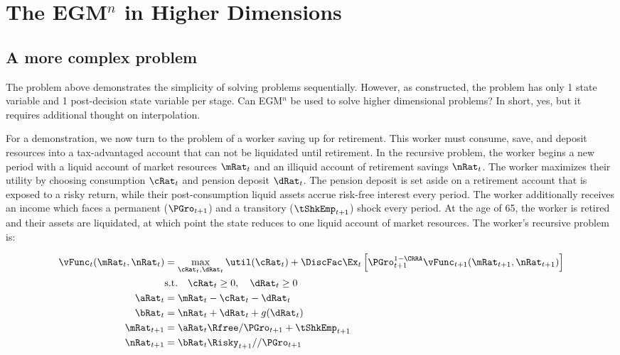 \documentclass[\econtexRoot/SequentialEGM]{subfiles}
\begin{document}
\hypertarget{higher-dimensions}{}
\par\section{The EGM$^n$ in Higher Dimensions}
\notinsubfile{\label{sec:higherdims}}

\subsection{A more complex problem}

The problem above demonstrates the simplicity of solving problems sequentially. However, as constructed, the problem has only 1 state variable and 1 post-decision state variable per stage. Can EGM$^n$ be used to solve higher dimensional problems? In short, yes, but it requires additional thought on interpolation.

For a demonstration, we now turn to the problem of a worker saving up for retirement. This worker must consume, save, and deposit resources into a tax-advantaged account that can not be liquidated until retirement. In the recursive problem, the worker begins a new period with a liquid account of market resources $\mRat_{t}$ and an illiquid account of retirement savings $\nRat_{t}$. The worker maximizes their utility by choosing consumption $\cRat_{t}$ and pension deposit $\dRat_{t}$. The pension deposit is set aside on a retirement account that is exposed to a risky return, while their post-consumption liquid assets accrue risk-free interest every period. The worker additionally receives an income which faces a permanent ($\PGro_{t+1}$) and a transitory ($\tShkEmp_{t+1}$) shock every period. At the age of 65, the worker is retired and their assets are liquidated, at which point the state reduces to one liquid account of market resources. The worker's recursive problem is:

\begin{equation}
    \begin{split}
        \vFunc_{t}(\mRat_{t}, \nRat_{t}) & = \max_{\cRat_{t}, \dRat_{t}} \util(\cRat_{t}) + \DiscFac \Ex_{t} \left[ \PGro_{t+1}^{1-\CRRA} \vFunc_{t+1}(\mRat_{t+1}, \nRat_{t+1}) \right] \\
        & \text{s.t.} \quad \cRat_{t} \ge 0, \quad \dRat_{t} \ge 0 \\
        \aRat_{t} & = \mRat_{t} - \cRat_{t} - \dRat_{t} \\
        \bRat_{t} & = \nRat_{t} + \dRat_{t} + g(\dRat_{t}) \\
        \mRat_{t+1} & = \aRat_{t} \Rfree / \PGro_{t+1}  + \tShkEmp_{t+1} \\
        \nRat_{t+1} & = \bRat_{t} \Risky_{t+1} / / \PGro_{t+1}
    \end{split}
\end{equation}
\end{document}
